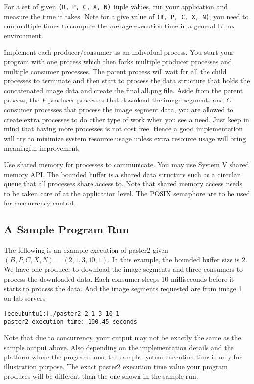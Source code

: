 For a set of given \verb+(B, P, C, X, N)+  tuple values, run your application and measure the time it takes. Note for a give value of \verb+(B, P, C, X, N)+, you need to run multiple times to compute the average execution time in a general Linux environment.

Implement each producer/consumer as an individual process. You start your program with one process which then forks multiple producer processes and multiple consumer processes. The parent process will wait for all the child processes to terminate and then start to process the data structure that holds the concatenated image data and create the final all.png file. Aside from the parent process, the $P$ producer processes that download the image segments and $C$ consumer processes that process the image segment data, you are allowed to create extra processes to do other type of work when you see a need. Just keep in mind that having more processes is not cost free. Hence a good implementation will try to minimize system resource usage unless extra resource usage will bring meaningful improvement.


Use shared memory for processes to communicate. You may use System V %
shared memory API. The bounded buffer is a shared data structure such as a circular queue that all processes share access to. Note that shared memory access needs to be taken care of at the application level. The POSIX semaphore are to be used for concurrency control.

\subsection*{A Sample Program Run}
The following is an example execution of paster2 given $(B, P, C, X, N) = (2, 1, 3, 10, 1)$. In this example, the bounded buffer size is 2. We have one producer to download the image segments and three  consumers to process the downloaded data. Each consumer sleeps 10 milliseconds before it starts to process the data. And the image segments requested are from image 1 on lab servers.
\begin{verbatim}
[eceubuntu1:]./paster2 2 1 3 10 1
paster2 execution time: 100.45 seconds
\end{verbatim}
Note that due to concurrency, your output may not be exactly the same as the sample output above. Also depending on the implementation details and the platform where the program runs, the sample system execution time is only for illustration purpose. The exact paster2 execution time value your program produces will be different than the one shown in the sample run.

